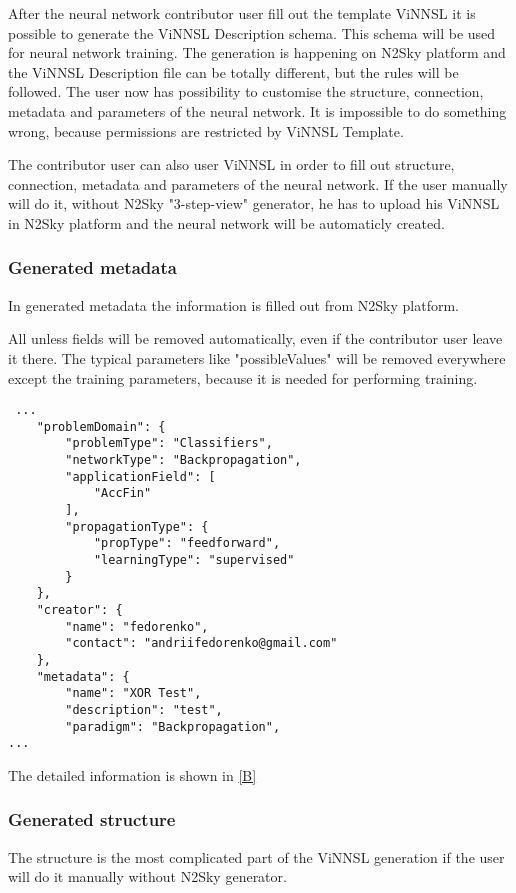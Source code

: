 After the neural network contributor user fill out the template ViNNSL it is possible to generate the ViNNSL Description schema. This schema will be used for neural network training. The generation is happening  on N2Sky platform and the ViNNSL Description file can be totally different, but the rules will be followed. The user now has possibility to customise the structure, connection, metadata and parameters of the neural network. It is impossible to do something wrong, because permissions are restricted by ViNNSL Template. 

The contributor user  can also user ViNNSL in order to fill out structure, connection, metadata and parameters of the neural network. If the user manually will do it, without N2Sky "3-step-view" generator, he has to upload his ViNNSL in N2Sky platform and the neural network will be automaticly created. 

\subsubsection{Generated metadata}\label{Generated metadata}

In generated metadata the information is filled out from N2Sky platform.

All unless fields will be removed automatically, even if the contributor user leave it there. The typical parameters like "possibleValues" will be removed everywhere except the training parameters, because it is needed for performing training.

 \begin{lstlisting}
 ...
	"problemDomain": {
		"problemType": "Classifiers",
		"networkType": "Backpropagation",
		"applicationField": [
			"AccFin"
		],
		"propagationType": {
			"propType": "feedforward",
			"learningType": "supervised"
		}
	},
	"creator": {
		"name": "fedorenko",
		"contact": "andriifedorenko@gmail.com"
	},
	"metadata": {
		"name": "XOR Test",
		"description": "test",
		"paradigm": "Backpropagation",
...
\end{lstlisting}

The detailed information is shown in \autoref{B}

\subsubsection{Generated structure}\label{Generated structure}

The structure is the most complicated part of the ViNNSL generation if the user will do it manually without N2Sky generator. 

